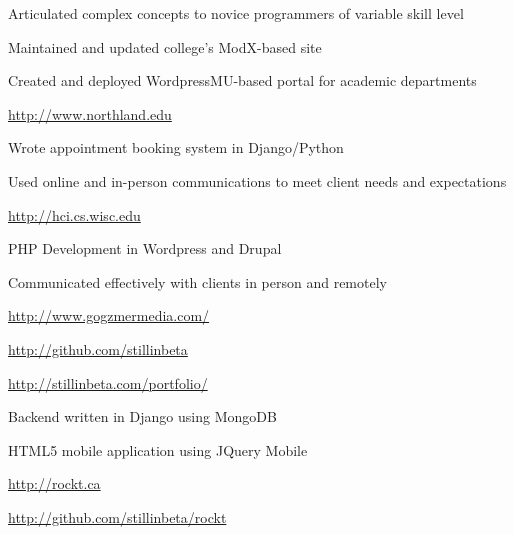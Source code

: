 \documentclass[letterpaper,11pt,notitlepage]{article}
\begin{document}
        \begin{employment}
            \item Articulated complex concepts to novice programmers of variable skill level
        \end{employment}
        \begin{employment}
            \item Maintained and updated college's ModX-based site
            \item Created and deployed WordpressMU-based portal for academic
            departments
            \item \url{http://www.northland.edu}
        \end{employment}
        \begin{employment}
            \item Wrote appointment booking system in Django/Python
            \item Used online and in-person communications to meet client needs
            and expectations
            \item \url{http://hci.cs.wisc.edu}
        \end{employment}
        \begin{employment}
            \item PHP Development in Wordpress and Drupal
            \item Communicated effectively with clients in person and remotely
            \item \url{http://www.gogzmermedia.com/}
        \end{employment}
\vbar
{}
        \begin{employment}
           \item \url{http://github.com/stillinbeta}
        \end{employment}
        \begin{employment}
            \item \url{http://stillinbeta.com/portfolio/}
        \end{employment}
        \begin{employment}
            \item Backend written in Django using MongoDB
            \item HTML5 mobile application using JQuery Mobile
            \item \url{http://rockt.ca}
            \item \url{http://github.com/stillinbeta/rockt}
        \end{employment}
\end{document}
